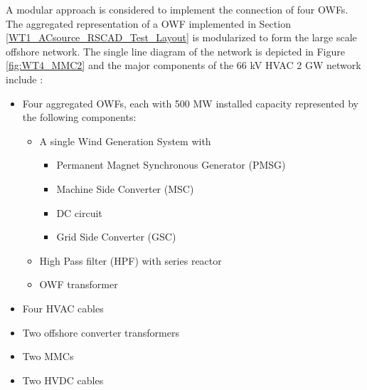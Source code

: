 A modular approach is considered to implement the connection of four \gls{OWF}s. The aggregated representation of a \gls{OWF} implemented in Section \ref{WT1_ACsource_RSCAD_Test_Layout} is modularized to form the large scale offshore network. The single line diagram of the network is depicted in Figure \ref{fig:WT4_MMC2} and the major components of the 66 kV \gls{HVAC} 2 GW network include :
\begin{itemize}
    \item Four aggregated \gls{OWF}s, each with 500 MW installed capacity represented by the following components:
    \begin{itemize}
        \item A single Wind Generation System with 
    \begin{itemize}
        \item Permanent Magnet Synchronous Generator (\gls{PMSG})
        \item Machine Side Converter (\gls{MSC})
        \item \gls{DC} circuit
        \item Grid Side Converter (\gls{GSC}) 
    \end{itemize}
        \item High Pass filter (\gls{HPF}) with series reactor
        \item \gls{OWF} transformer
    \end{itemize}
    \item Four \gls{HVAC} cables  
    \item Two offshore converter transformers
    \item Two \gls{MMC}s
    \item Two \gls{HVDC} cables
\end{itemize}

